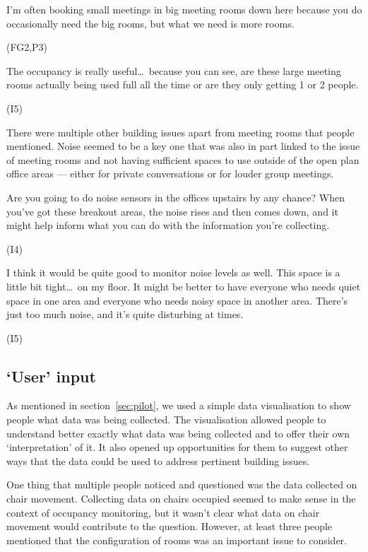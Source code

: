 \begin{qt}I’m often booking small meetings in big meeting rooms
  down here because you do occasionally need the big rooms, but what
  we need is more rooms.\end{qt} (FG2,P3)

\begin{qt}The occupancy is
really useful\ldots\  because you can see, are these
large meeting rooms actually being used full all the time or are they
only getting 1 or 2 people.\end{qt} (I5)

There were multiple other building issues apart from meeting rooms
that people mentioned. Noise seemed to be a key one that was also in
part linked to the issue of meeting rooms and not having sufficient
spaces to use outside of the open plan office areas --- either for
private conversations or for louder group meetings.

\begin{qt}Are you going to do noise sensors in the offices upstairs by any
chance? When you’ve got these breakout areas, the noise rises and then
comes down, and it might help inform what you can do with the
information you’re collecting. \end{qt} (I4)

\begin{qt}I think it would be quite good to monitor noise levels as well. This
space is a little bit tight\ldots\  on my floor. It might be better to have
everyone who needs quiet space in one area and everyone who needs
noisy space in another area. There’s just too much noise, and it’s quite disturbing at times.\end{qt} (I5)

\subsection{`User' input}
\label{sec:user-input}

As mentioned in section~\ref{sec:pilot}, we used a simple data
visualisation to show people what data was being collected. The
visualisation allowed people to understand better exactly what data
was being collected and to offer their own ‘interpretation’ of it. It
also opened up opportunities for them to suggest other ways that the
data could be used to address pertinent building issues.

One thing that multiple people noticed and questioned was the data
collected on chair movement. Collecting data on chairs occupied seemed
to make sense in the context of occupancy monitoring, but it wasn’t
clear what data on chair movement would contribute to the
question. However, at least three people mentioned that the
configuration of rooms was an important issue to consider.

